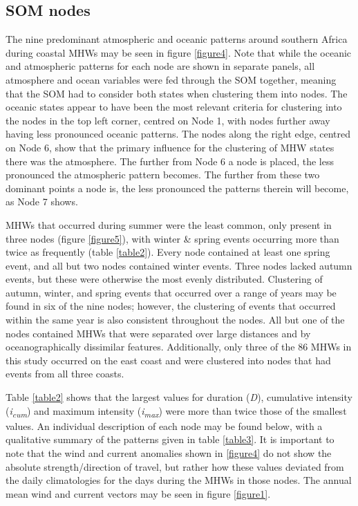 \documentclass[utf8]{frontiersSCNS}
\begin{document}
\subsection{SOM nodes}
The nine predominant atmospheric and oceanic patterns around southern Africa during coastal MHWs may be seen in figure \ref{figure4}. Note that while the oceanic and atmospheric patterns for each node are shown in separate panels, all atmosphere and ocean variables were fed through the SOM together, meaning that the SOM had to consider both states when clustering them into nodes. The oceanic states appear to have been the most relevant criteria for clustering into the nodes in the top left corner, centred on Node 1, with nodes further away having less pronounced oceanic patterns. The nodes along the right edge, centred on Node 6, show that the primary influence for the clustering of MHW states there was the atmosphere. The further from Node 6 a node is placed, the less pronounced the atmospheric pattern becomes. The further from these two dominant points a node is, the less pronounced the patterns therein will become, as Node 7 shows.

MHWs that occurred during summer were the least common, only present in three nodes (figure \ref{figure5}), with winter \& spring events occurring more than twice as frequently (table \ref{table2}). Every node contained at least one spring event, and all but two nodes contained winter events. Three nodes lacked autumn events, but these were otherwise the most evenly distributed. Clustering of autumn, winter, and spring events that occurred over a range of years may be found in six of the nine nodes; however, the clustering of events that occurred within the same year is also consistent throughout the nodes. All but one of the nodes contained MHWs that were separated over large distances and by oceanographically dissimilar features. Additionally, only three of the 86 MHWs in this study occurred on the east coast and were clustered into nodes that had events from all three coasts.

Table \ref{table2} shows that the largest values for duration (\emph{D}), cumulative intensity (\emph{i\textsubscript{cum}}) and maximum intensity (\emph{i\textsubscript{max}}) were more than twice those of the smallest values. An individual description of each node may be found below, with a qualitative summary of the patterns given in table \ref{table3}. It is important to note that the wind and current anomalies shown in \ref{figure4} do not show the absolute strength/direction of travel, but rather how these values deviated from the daily climatologies for the days during the MHWs in those nodes. The annual mean wind and current vectors may be seen in figure \ref{figure1}.
\end{document}
